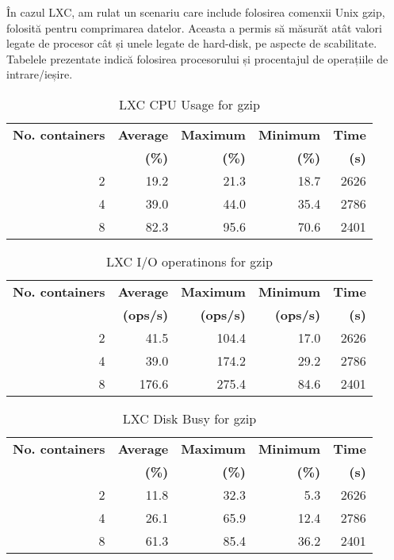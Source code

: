 În cazul LXC, am rulat un scenariu care include folosirea comenxii Unix gzip,
folosită pentru comprimarea datelor. Aceasta a permis să măsurăt atât valori
legate de procesor cât și unele legate de hard-disk, pe aspecte de
scabilitate. Tabelele prezentate indică folosirea procesorului și procentajul
de operațiile de intrare/ieșire.

\begin{table}[ht]
  \centering
  \begin{tabular}{@{}rrrrr@{}}
    \toprule
    \textbf{No. containers} & \textbf{Average} & \textbf{Maximum} &
    \textbf{Minimum} & \textbf{Time} \\
    & \textbf{(\%)} & \textbf{(\%)} & \textbf{(\%)} &\textbf{(s)} \\
    \midrule
    2 & 19.2 & 21.3 & 18.7 & 2626 \\
    4 & 39.0 & 44.0 & 35.4 & 2786 \\
    8 & 82.3 & 95.6 & 70.6 & 2401 \\
    \bottomrule
  \end{tabular}
  \caption{LXC CPU Usage for gzip}
  \label{table:virt-infra:lxc-cpu}
\end{table}

\begin{table}[ht]
  \centering
  \begin{tabular}{@{}rrrrr@{}}
    \toprule
    \textbf{No. containers} & \textbf{Average} & \textbf{Maximum} &
    \textbf{Minimum} & \textbf{Time} \\
    & \textbf{(ops/s)} & \textbf{(ops/s)} & \textbf{(ops/s)} &\textbf{(s)} \\
    \midrule
    2 & 41.5 & 104.4 & 17.0 & 2626 \\
    4 & 39.0 & 174.2 & 29.2 & 2786 \\
    8 & 176.6 & 275.4 & 84.6 & 2401 \\
    \bottomrule
  \end{tabular}
  \caption{LXC I/O operatinons for gzip}
  \label{table:virt-infra:lxc-io}
\end{table}

\begin{table}[ht]
  \centering
  \begin{tabular}{@{}rrrrr@{}}
    \toprule
    \textbf{No. containers} & \textbf{Average} & \textbf{Maximum} &
    \textbf{Minimum} & \textbf{Time} \\
    & \textbf{(\%)} & \textbf{(\%)} & \textbf{(\%)} &\textbf{(s)} \\
    \midrule
    2 & 11.8 & 32.3 & 5.3 & 2626 \\
    4 & 26.1 & 65.9 & 12.4 & 2786 \\
    8 & 61.3 & 85.4 & 36.2 & 2401 \\
    \bottomrule
  \end{tabular}
  \caption{LXC Disk Busy for gzip}
  \label{table:virt-infra:lxc-disk}
\end{table}

